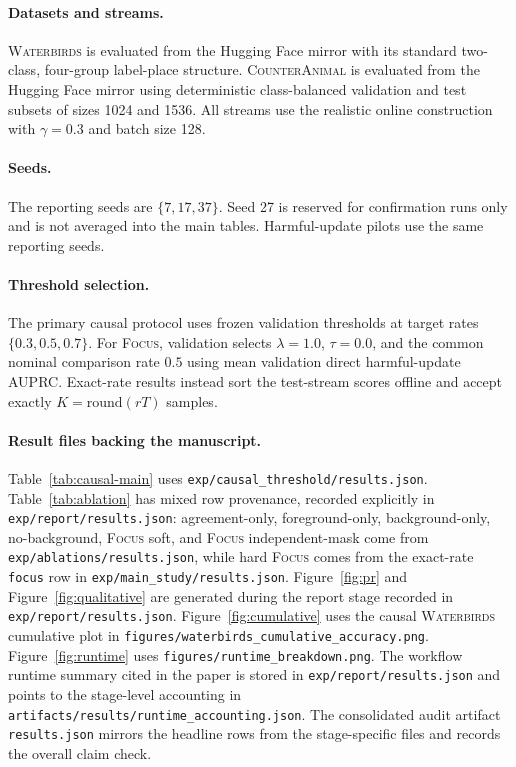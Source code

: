 \documentclass{article}
\newcommand{\focus}{\textsc{Focus}}
\newcommand{\wb}{\textsc{Waterbirds}}
\newcommand{\ca}{\textsc{CounterAnimal}}
\begin{document}
\paragraph{Datasets and streams.}
\wb{} is evaluated from the Hugging Face mirror with its standard two-class, four-group label-place structure. \ca{} is evaluated from the Hugging Face mirror using deterministic class-balanced validation and test subsets of sizes 1024 and 1536. All streams use the realistic online construction with $\gamma=0.3$ and batch size 128.

\paragraph{Seeds.}
The reporting seeds are $\{7,17,37\}$. Seed 27 is reserved for confirmation runs only and is not averaged into the main tables. Harmful-update pilots use the same reporting seeds.

\paragraph{Threshold selection.}
The primary causal protocol uses frozen validation thresholds at target rates $\{0.3,0.5,0.7\}$. For \focus{}, validation selects $\lambda=1.0$, $\tau=0.0$, and the common nominal comparison rate $0.5$ using mean validation direct harmful-update AUPRC. Exact-rate results instead sort the test-stream scores offline and accept exactly $K=\mathrm{round}(rT)$ samples.

\paragraph{Result files backing the manuscript.}
Table~\ref{tab:causal-main} uses \texttt{exp/causal\_threshold/results.json}. Table~\ref{tab:ablation} has mixed row provenance, recorded explicitly in \texttt{exp/report/results.json}: agreement-only, foreground-only, background-only, no-background, \focus{} soft, and \focus{} independent-mask come from \texttt{exp/ablations/results.json}, while hard \focus{} comes from the exact-rate \texttt{focus} row in \texttt{exp/main\_study/results.json}. Figure~\ref{fig:pr} and Figure~\ref{fig:qualitative} are generated during the report stage recorded in \texttt{exp/report/results.json}. Figure~\ref{fig:cumulative} uses the causal \wb{} cumulative plot in \texttt{figures/waterbirds\_cumulative\_accuracy.png}. Figure~\ref{fig:runtime} uses \texttt{figures/runtime\_breakdown.png}. The workflow runtime summary cited in the paper is stored in \texttt{exp/report/results.json} and points to the stage-level accounting in \texttt{artifacts/results/runtime\_accounting.json}. The consolidated audit artifact \texttt{results.json} mirrors the headline rows from the stage-specific files and records the overall claim check.
\end{document}
